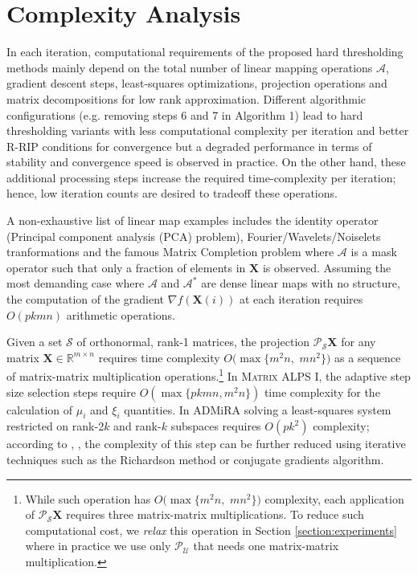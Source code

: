 \documentclass[twocolumn]{svjour3}
\newcommand{\sensing}{\boldsymbol{\mathcal{A}}}
\newcommand{\signal}{\boldsymbol{X}}
\newcommand{\dimension}{m \times n}
\newcommand{\numsam}{p}
\newcommand{\rank}{k}
\begin{document}
\section{Complexity Analysis}{\label{section:complexity}}

In each iteration, computational requirements of the proposed hard thresholding methods mainly depend on the total number of linear mapping operations $\sensing$, gradient descent steps, least-squares optimizations, projection operations and matrix decompositions for low rank approximation. Different algorithmic configurations (e.g. removing steps 6 and 7 in Algorithm 1) lead to hard thresholding variants with less computational complexity per iteration and better R-RIP conditions for convergence but a degraded performance in terms of stability and convergence speed is observed in practice. On the other hand, these additional processing steps increase the required time-complexity per iteration; hence, low iteration counts are desired to tradeoff these operations. 

A non-exhaustive list of linear map examples includes the identity operator (Principal component analysis (PCA) problem), Fourier/Wavelets/Noiselets tranformations and the famous Matrix Completion problem where $\sensing $ is a mask operator such that only a fraction of elements in $\signal $ is observed. Assuming the most demanding case where $ \sensing $ and $ \sensing^\ast $ are dense linear maps with no structure, the computation of the gradient $  \nabla f(\signal(i)) $ at each iteration requires $ O(\numsam \rank m n) $ arithmetic operations. 

Given a set $ \mathcal{S} $ of orthonormal, rank-1 matrices, the projection $ \mathcal{P}_{\mathcal{S}}\signal $ for any matrix $ \signal \in \mathbb{R}^{\dimension} $ requires time complexity $ O(\max\lbrace m^2 n,$ $ m n^2 \rbrace) $ as a sequence of matrix-matrix multiplication operations.\footnote{While such operation has $O(\max\lbrace m^2 n,$ $ m n^2 \rbrace)$ complexity, each application of $\mathcal{P}_{\mathcal{S}} \signal$ requires three matrix-matrix multiplications. To reduce such computational cost, we {\it relax} this operation in Section \ref{section:experiments} where in practice we use only $\mathcal{P}_{\mathcal{U}}$ that needs one matrix-matrix multiplication. } In \textsc{Matrix ALPS I}, the adaptive step size selection steps require $ O(\max\lbrace \numsam \rank m n, m^2 n\rbrace) $ time complexity for the calculation of $ \mu_i $ and $ \xi_i $ quantities. In ADMiRA solving a least-squares system restricted on rank-2$ \rank $ and rank-$ \rank  $ subspaces requires $ O(\numsam k^2) $ complexity; according to \cite{cosamp}, \cite{admira2010}, the complexity of this step can be further reduced using iterative techniques such as the Richardson method or conjugate gradients algorithm. 
\end{document}
